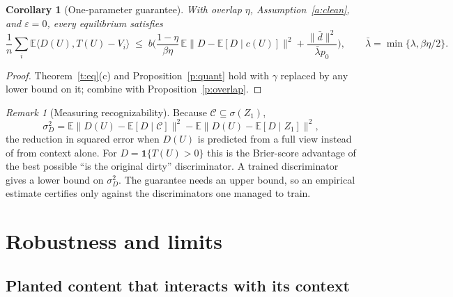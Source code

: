\documentclass[11pt]{article}
\newtheorem{corollary}{Corollary}
\theoremstyle{definition}
\theoremstyle{remark}
\newtheorem{remark}{Remark}
\newcommand{\E}{\mathbb{E}}
\newcommand{\cC}{\mathcal{C}}
\newcommand{\ip}[2]{\langle #1,#2\rangle}
\newcommand{\norm}[1]{\lVert #1\rVert}
\newcommand{\lbar}{\bar\lambda}
\begin{document}
\begin{corollary}[One-parameter guarantee]\label{c:one}
With overlap $\eta$, Assumption~\ref{a:clean}, and $\varepsilon=0$, every equilibrium satisfies
\[
\frac1n\sum_i\E\ip{D(U)}{T(U)-V_i}\;\le\;b\Big(\frac{1-\eta}{\beta\eta}\,\E\norm{D-\E[D\mid c(U)]}^2+\frac{\norm{\bar d}^2}{\lbar p_0}\Big),\qquad \lbar=\min\{\lambda,\beta\eta/2\}.
\]
\end{corollary}
\begin{proof}
Theorem~\ref{t:eq}(c) and Proposition~\ref{p:quant} hold with $\gamma$ replaced by any lower bound on it; combine with Proposition~\ref{p:overlap}.
\end{proof}

\begin{remark}[Measuring recognizability]\label{r:measure}
Because $\cC\subseteq\sigma(Z_1)$,
\[
\sigma_D^2=\E\norm{D(U)-\E[D\mid\cC]}^2-\E\norm{D(U)-\E[D\mid Z_1]}^2 ,
\]
the reduction in squared error when $D(U)$ is predicted from a full view instead of from context alone. For $D=\mathbf 1\{T(U)>0\}$ this is the Brier-score advantage of the best possible ``is the original dirty'' discriminator. A trained discriminator gives a lower bound on $\sigma_D^2$. The guarantee needs an upper bound, so an empirical estimate certifies only against the discriminators one managed to train.
\end{remark}

\section{Robustness and limits}\label{sec:robust}

\subsection{Planted content that interacts with its context}
\end{document}
